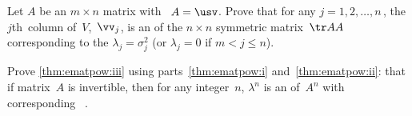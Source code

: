 \begin{exercise} \label{ex:} 
Let \(A\) be an \(m\times n\)  matrix with \svd\ \(A=\usv\).
Prove that for any \(j=1,2,\ldots,n\)\,, the \(j\)th~column of~\(V\),~\(\vv_j\), is an  of the \(n\times n\) {symmetric matrix}~\(\tr AA\) corresponding to the  \(\lambda_j=\sigma_j^2\) (or \(\lambda_j=0\) if \(m<j\leq n\)).
\end{exercise}



\begin{exercise} \label{ex:ematpow:iii} 
Prove \autoref{thm:ematpow:iii} using parts~\ref{thm:ematpow:i} 
and~\ref{thm:ematpow:ii}: that if matrix~\(A\) is {invertible}, then 
for any integer~\(n\), \(\lambda^n\) is an  
of~\(A^n\) with corresponding ~\xv.
\end{exercise}





